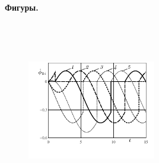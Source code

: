 % 

% 

% 

% 


\newpage

{\bf Фигуры.}

\begin{figure}[H]
        \centering
        \caption{\ }
        \label{fig:wheel}
    \endminipage
        \centering
        \caption{\ }
        \label{fig:vehicle}
    \endminipage
\end{figure}

\begin{figure}[H]
        \centering
        \caption{\ }
        \label{fig:overlap}
    \endminipage
        \centering
        \caption{\ }
        \label{fig:change}
    \endminipage
\end{figure}




\begin{figure}[H]
  \includegraphics[width=0.5\textwidth]{pic/figure5_1.pdf}
  \caption{\ }
  \label{fig:selfrot}
\end{figure}

